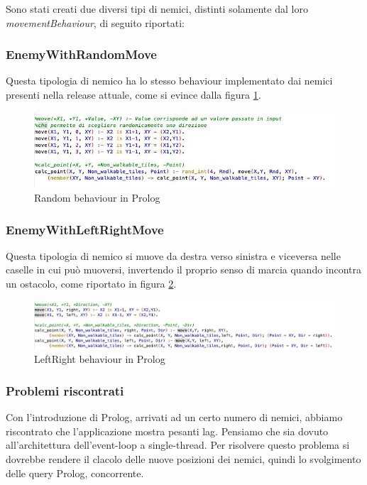     Sono stati creati due diversi tipi di nemici, distinti solamente dal loro \textit{movementBehaviour}, di seguito riportati:
    
    \subsubsection{EnemyWithRandomMove}
    Questa tipologia di nemico ha lo stesso behaviour implementato dai nemici presenti nella release attuale, come si evince dalla figura \ref{random}.
    
    \begin{figure}[H]
    \centering
      \includegraphics[width=15cm]{res/randomProlog.jpg}
      \caption{Random behaviour in Prolog}
      \label{random}
    \end{figure}
    
    \subsubsection{EnemyWithLeftRightMove}
    Questa tipologia di nemico si muove da destra verso sinistra e viceversa nelle caselle in cui può muoversi, invertendo il proprio senso di marcia quando incontra un ostacolo, come riportato in figura \ref{left}.
    
    \begin{figure}[H]
    \centering
      \includegraphics[width=16cm]{res/leftRightMove.jpg}
      \caption{LeftRight behaviour in Prolog}
      \label{left}
    \end{figure}
    
    \subsubsection{Problemi riscontrati}
    Con l'introduzione di Prolog, arrivati ad un certo numero di nemici, abbiamo riscontrato che l'applicazione mostra pesanti lag.
    Pensiamo che sia dovuto all'architettura dell'event-loop a single-thread. Per risolvere questo problema si dovrebbe rendere il clacolo delle nuove posizioni dei nemici, quindi lo svolgimento delle query Prolog, concorrente.